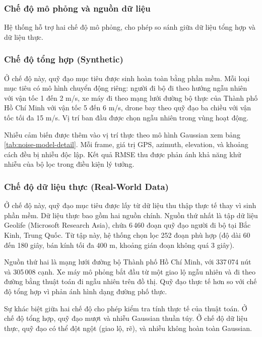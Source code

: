 \subsubsection{Chế độ mô phỏng và nguồn dữ liệu}

\hspace{0.5cm} Hệ thống hỗ trợ hai chế độ mô phỏng, cho phép so sánh giữa dữ liệu tổng hợp và dữ liệu thực.

\subsubsection{Chế độ tổng hợp (Synthetic)}

\hspace{0.5cm} Ở chế độ này, quỹ đạo mục tiêu được sinh hoàn toàn bằng phần mềm. Mỗi loại mục tiêu có mô hình chuyển động riêng: người đi bộ đi theo hướng ngẫu nhiên với vận tốc 1 đến 2 m/s, xe máy đi theo mạng lưới đường bộ thực của Thành phố Hồ Chí Minh với vận tốc 5 đến 6 m/s, drone bay theo quỹ đạo ba chiều với vận tốc tối đa 15 m/s. Vị trí ban đầu được chọn ngẫu nhiên trong vùng hoạt động.

Nhiễu cảm biến được thêm vào vị trí thực theo mô hình Gaussian xem bảng \ref{tab:noise-model-detail}. Mỗi frame, giá trị GPS, azimuth, elevation, và khoảng cách đều bị nhiễu độc lập. Kết quả RMSE thu được phản ánh khả năng khử nhiễu của bộ lọc trong điều kiện lý tưởng.

\subsubsection{Chế độ dữ liệu thực (Real-World Data)}

\hspace{0.5cm} Ở chế độ này, quỹ đạo mục tiêu được lấy từ dữ liệu thu thập thực tế thay vì sinh phần mềm. Dữ liệu thực bao gồm hai nguồn chính. Nguồn thứ nhất là tập dữ liệu Geolife (Microsoft Research Asia), chứa 6\,460 đoạn quỹ đạo người đi bộ tại Bắc Kinh, Trung Quốc. Từ tập này, hệ thống chọn lọc 252 đoạn phù hợp (độ dài 60 đến 180 giây, bán kính tối đa 400 m, khoảng gián đoạn không quá 3 giây).

Nguồn thứ hai là mạng lưới đường bộ Thành phố Hồ Chí Minh, với 337\,074 nút và 305\,008 cạnh. Xe máy mô phỏng bắt đầu từ một giao lộ ngẫu nhiên và đi theo đường bằng thuật toán đi ngẫu nhiên trên đồ thị. Quỹ đạo thực tế hơn so với chế độ tổng hợp vì phản ánh hình dạng đường phố thực.

Sự khác biệt giữa hai chế độ cho phép kiểm tra tính thực tế của thuật toán. Ở chế độ tổng hợp, quỹ đạo mượt và nhiễu Gaussian thuần túy. Ở chế độ dữ liệu thực, quỹ đạo có thể đột ngột (giao lộ, rẽ), và nhiễu không hoàn toàn Gaussian.

